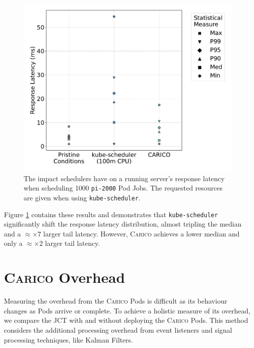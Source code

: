 \begin{figure}[ht!]
    \centering
    \includegraphics[width=\textwidth]{images/response-latency.pdf}
    \caption{The impact schedulers have  on a running server's response latency
    when scheduling 1000 \texttt{pi-2000} Pod Jobs. The requested resources are
    given when using \texttt{kube-scheduler}.}
    \label{fig:impacted-latency}
\end{figure}

Figure \ref{fig:impacted-latency} contains these results and demonstrates that
\texttt{kube-scheduler} significantly shift the response latency distribution,
almost tripling the median and a $\approx \times 7$ larger tail latency.
However, \textsc{Carico} achieves a lower median and only a $\approx \times2$
larger tail latency.

\section{\textsc{Carico} Overhead}
\label{sec:eval-overhead}
Measuring the overhead from the \textsc{Carico} Pods is difficult as its
behaviour changes as Pods arrive or complete. To achieve a holistic measure of
its overhead, we compare the JCT with and without deploying
the \textsc{Carico} Pods. This method considers the additional processing
overhead from event listeners and signal processing techniques, like Kalman
Filters.

